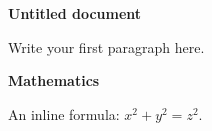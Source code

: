 \textbf{Untitled document}\par
Write your first paragraph here.\par
\textbf{Mathematics}\par
An inline formula: $x^2+y^2=z^2$.\par
\bye
